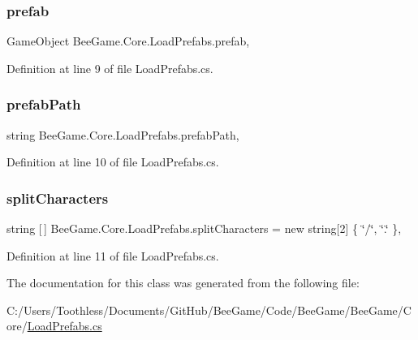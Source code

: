 \subsubsection{\texorpdfstring{prefab}{prefab}}
{\footnotesize\ttfamily Game\+Object Bee\+Game.\+Core.\+Load\+Prefabs.\+prefab\hspace{0.3cm}{\ttfamily [static]}, {\ttfamily [private]}}



Definition at line 9 of file Load\+Prefabs.\+cs.

\mbox{\label{class_bee_game_1_1_core_1_1_load_prefabs_a0f61e1d478ea8953fc4cfa5fa4a59b90}} 
\subsubsection{\texorpdfstring{prefab\+Path}{prefabPath}}
{\footnotesize\ttfamily string Bee\+Game.\+Core.\+Load\+Prefabs.\+prefab\+Path\hspace{0.3cm}{\ttfamily [static]}, {\ttfamily [private]}}



Definition at line 10 of file Load\+Prefabs.\+cs.

\mbox{\label{class_bee_game_1_1_core_1_1_load_prefabs_a774463c4978def7fe0052c4ed1b46549}} 
\subsubsection{\texorpdfstring{split\+Characters}{splitCharacters}}
{\footnotesize\ttfamily string \mbox{[}$\,$\mbox{]} Bee\+Game.\+Core.\+Load\+Prefabs.\+split\+Characters = new string\mbox{[}2\mbox{]} \{ \char`\"{}/\char`\"{}, \char`\"{}.\char`\"{} \}\hspace{0.3cm}{\ttfamily [static]}, {\ttfamily [private]}}



Definition at line 11 of file Load\+Prefabs.\+cs.



The documentation for this class was generated from the following file\+:\begin{DoxyCompactItemize}
\item 
C\+:/\+Users/\+Toothless/\+Documents/\+Git\+Hub/\+Bee\+Game/\+Code/\+Bee\+Game/\+Bee\+Game/\+Core/\hyperlink{_load_prefabs_8cs}{Load\+Prefabs.\+cs}\end{DoxyCompactItemize}
